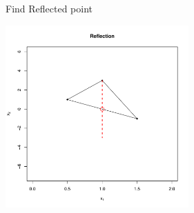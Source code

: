 \documentclass[10pt]{beamer}
\begin{document}
                                                                                              \begin{frame}{Find Reflected point}
                                                                                                \begin{center}
                                                                                                  \includegraphics[height=7cm]{RCode/nmrefl.pdf}
                                                                                                \end{center}
                                                                                              \end{frame}
\end{document}
